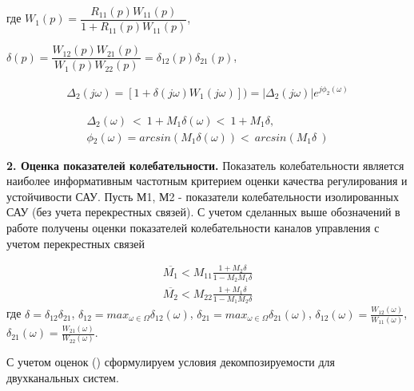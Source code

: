 где $W_{1}(p)=\dfrac{R_{11}(p)W_{11}(p)}{1+R_{11}(p)W_{11}(p)}$, 

$\delta{}(p)=\dfrac{W_{12}(p)W_{21}(p)}{W_{1}(p)W_{22}(p)}=\delta{}_{12}(p)\delta{}_{21}(p)$,

\begin{equation}
\label{eq:p2:15-}
\begin{alignedat}{2}
{\Delta{}}_2(j\omega{})=[1+\delta{}(j\omega{})W_1(j\omega{})])=\left\vert{}{\Delta{}}_2(j\omega{})\right\vert{}e^{j{\phi{}}_2(\omega{})}
\end{alignedat}
\end{equation}

\begin{equation}
\label{eq:p2:15-2}
\begin{alignedat}{2}
\Delta{}_2(\omega{})\ <\ 1+M_1\delta{}(\omega{})<\ 1+M_1\delta{},\\
\phi{}_2(\omega{})=arcsin(M_1\delta{}(\omega{}))<\ arcsin(M_1\delta{}\ )
\end{alignedat}
\end{equation}

\textbf{2. Оценка показателей колебательности.} \label{sec:ch2/sec5/s2}
Показатель колебательности является наиболее информативным частотным критерием оценки качества регулирования и устойчивости САУ. Пусть М1, М2 - показатели колебательности изолированных САУ (без учета перекрестных связей). С учетом сделанных выше обозначений в работе \cite[]{Karpov} получены оценки показателей колебательности каналов управления с учетом перекрестных связей

\begin{equation}
\label{eq:p2:16-}
\begin{alignedat}{2}
\overline{M_1}<M_{11}\frac{1+M_2\delta{}}{1-M_2M_1\delta{}}\\
\overline{M_2}<M_{22}\frac{1+M_1\delta{}}{1-M_1M_2\delta{}}
\end{alignedat}
\end{equation}
где 
$\delta{}={\delta{}}_{12}{\delta{}}_{21}$,
${\delta{}}_{12}=max_{\omega{}\in{}\Omega{}}{\delta{}}_{12}\left(\omega{}\right)$, 
${\delta{}}_{21}=max_{\omega{}\in{}\Omega{}}{\delta{}}_{21}\left(\omega{}\right)$,
${\delta{}}_{12}\left(\omega{}\right)=\frac{W_{12}\left(\omega{}\right)}{W_{11}\left(\omega{}\right)}$, 
${\delta{}}_{21}\left(\omega{}\right)=\frac{W_{21}\left(\omega{}\right)}{W_{22}\left(\omega{}\right)}$.

С учетом оценок () сформулируем условия декомпозируемости для двухканальных систем.

